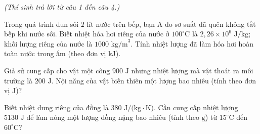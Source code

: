 \vspace{0.15cm}
\begin{flushleft}
	{\color{blue!50!green}}
	\textit{\small (Thí sinh trả lời từ câu 1 đến câu 4.)}
\end{flushleft}
\setcounter{ex}{0}

\begin{ex}
	Trong quá trình đun sôi $2\text{ lít}$ nước trên bếp, bạn A do sơ suất đã quên không tắt bếp khi nước sôi. Biết nhiệt hóa hơi riêng của nước ở $100^\circ\text{C}$ là $2{,}26 \times 10^6\text{ J/kg}$; khối lượng riêng của nước là $1000\text{ kg/m}^3$. Tính nhiệt lượng đã làm hóa hơi hoàn toàn nước trong ấm (theo đơn vị $\text{kJ}$).

\end{ex}

\begin{ex}
	Giả sử cung cấp cho vật một công $900\text{ J}$ nhưng nhiệt lượng mà vật thoát ra môi trường là $200\text{ J}$. Nội năng của vật biến thiên một lượng bao nhiêu (tính theo đơn vị $\text{J}$)?

\end{ex}

\begin{ex}
	Biết nhiệt dung riêng của đồng là $380\text{ J/(kg}\cdot\text{K)}$. Cần cung cấp nhiệt lượng $5130\text{ J}$ để làm nóng một lượng đồng nặng bao nhiêu (tính theo $\text{g}$) từ $15^\circ\text{C}$ đến $60^\circ\text{C}$?

\end{ex}

